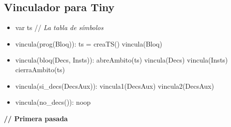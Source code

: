 \documentclass[11pt]{article}
\begin{document}
        \subsection{Vinculador para Tiny}
            \begin{itemize}
                \item var ts \/// \textit{La tabla de símbolos}
                \item vincula(prog(Bloq)):
                    \subitem ts = creaTS()
                    \subitem vincula(Bloq)       
                \item vincula(bloq(Decs, Insts)):
                    \subitem abreAmbito(ts)
                    \subitem vincula(Decs)
                    \subitem vincula(Insts)
                    \subitem cierraAmbito(ts)
                \item vincula(si\_decs(DecsAux)):
                    \subitem vincula1(DecsAux)
                    \subitem vincula2(DecsAux)
                \item vincula(no\_decs()):
                    \subitem noop
            \end{itemize}
            \textbf{\/// Primera pasada}
\end{document}
